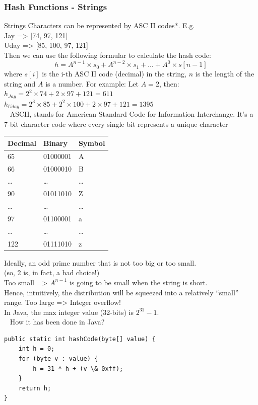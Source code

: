 \subsubsection{Hash Functions - Strings}
Strings
Characters can be represented by ASC II codes*.
E.g. \\
Jay => [74, 97, 121] \\
Uday => [85, 100, 97, 121] \\
Then we can use the following formular to calculate the hash code: \\
\[
h=A^{n-1} \times s_0 + A^{n-2} \times s_1 + \dots + A^0 \times s[n-1]
\]
where $s[i]$ is the i-th ASC II code (decimal) in the string, $n$ is the length of the string and $A$ is a number.
For example: Let $A=2$, then:
$h_{Jay}=2^2 \times 74 + 2 \times 97 + 121 = 611$ \\
$h_{Uday}=2^3 \times 85 + 2^2 \times 100 + 2 \times 97 + 121 = 1395$ \\
 
ASCII, stands for American Standard Code for Information Interchange.
It's a 7-bit character code where every single bit represents a unique character \\
\begin{tabular}{|l|l|l|}
\hline
Decimal & Binary & Symbol \\
\hline
65 & 01000001 & A \\
66 & 01000010 & B \\
\ldots & \ldots & \ldots \\
90 & 01011010 & Z \\
\ldots & \ldots & \ldots \\
97 & 01100001 & a \\
\ldots & \ldots & \ldots \\
122 & 01111010 & z \\
\hline
\end{tabular}

Ideally, an odd prime number that is not too big or too small. \\
(so, 2 is, in fact, a bad choice!) \\
Too small => $A^{n-1}$ is going to be small when the string is short. \\
Hence, intuitively, the distribution will be squeezed into a relatively “small” range.
Too large => Integer overflow! \\
In Java, the max integer value (32-bits) is $2^{31}-1$. \\
 
How it has been done in Java?
\begin{lstlisting}
public static int hashCode(byte[] value) { 
    int h = 0;
    for (byte v : value) { 
        h = 31 * h + (v \& 0xff);
    }
    return h;
}
\end{lstlisting}

